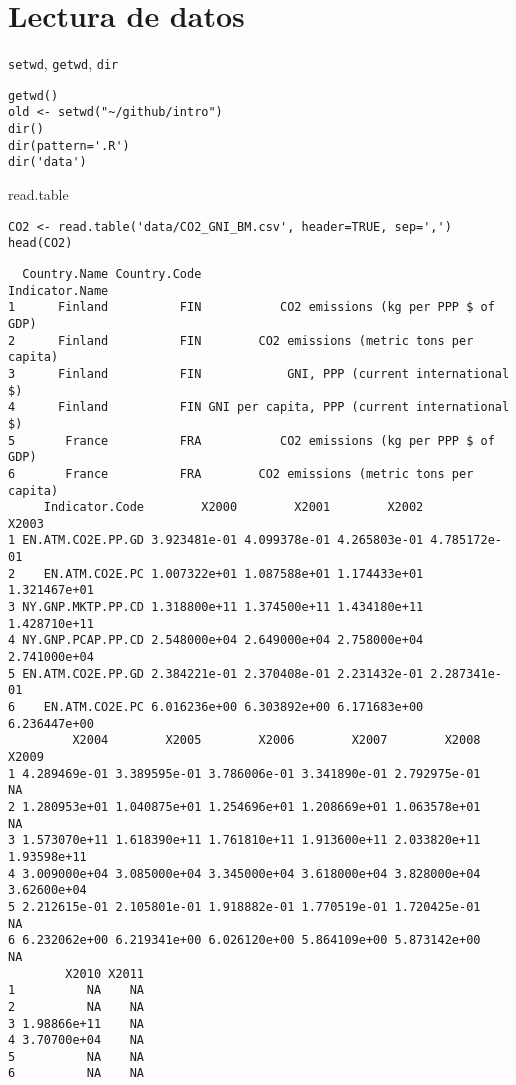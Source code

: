 \documentclass[xcolor={usenames,svgnames,dvipsnames}]{beamer}
\begin{document}
\section{Lectura de datos}
\label{sec-2}
\begin{frame}[fragile,label=sec-2-1]{\texttt{setwd}, \texttt{getwd}, \texttt{dir}}
 \lstset{language=R,numbers=none}
\begin{lstlisting}
getwd()
old <- setwd("~/github/intro")
dir()
dir(pattern='.R')
dir('data')
\end{lstlisting}
\end{frame}
\begin{frame}[fragile,label=sec-2-2]{read.table}
 \lstset{language=R,numbers=none}
\begin{lstlisting}
CO2 <- read.table('data/CO2_GNI_BM.csv', header=TRUE, sep=',')
head(CO2)
\end{lstlisting}

\begin{verbatim}
  Country.Name Country.Code                                Indicator.Name
1      Finland          FIN           CO2 emissions (kg per PPP $ of GDP)
2      Finland          FIN        CO2 emissions (metric tons per capita)
3      Finland          FIN            GNI, PPP (current international $)
4      Finland          FIN GNI per capita, PPP (current international $)
5       France          FRA           CO2 emissions (kg per PPP $ of GDP)
6       France          FRA        CO2 emissions (metric tons per capita)
     Indicator.Code        X2000        X2001        X2002        X2003
1 EN.ATM.CO2E.PP.GD 3.923481e-01 4.099378e-01 4.265803e-01 4.785172e-01
2    EN.ATM.CO2E.PC 1.007322e+01 1.087588e+01 1.174433e+01 1.321467e+01
3 NY.GNP.MKTP.PP.CD 1.318800e+11 1.374500e+11 1.434180e+11 1.428710e+11
4 NY.GNP.PCAP.PP.CD 2.548000e+04 2.649000e+04 2.758000e+04 2.741000e+04
5 EN.ATM.CO2E.PP.GD 2.384221e-01 2.370408e-01 2.231432e-01 2.287341e-01
6    EN.ATM.CO2E.PC 6.016236e+00 6.303892e+00 6.171683e+00 6.236447e+00
         X2004        X2005        X2006        X2007        X2008       X2009
1 4.289469e-01 3.389595e-01 3.786006e-01 3.341890e-01 2.792975e-01          NA
2 1.280953e+01 1.040875e+01 1.254696e+01 1.208669e+01 1.063578e+01          NA
3 1.573070e+11 1.618390e+11 1.761810e+11 1.913600e+11 2.033820e+11 1.93598e+11
4 3.009000e+04 3.085000e+04 3.345000e+04 3.618000e+04 3.828000e+04 3.62600e+04
5 2.212615e-01 2.105801e-01 1.918882e-01 1.770519e-01 1.720425e-01          NA
6 6.232062e+00 6.219341e+00 6.026120e+00 5.864109e+00 5.873142e+00          NA
        X2010 X2011
1          NA    NA
2          NA    NA
3 1.98866e+11    NA
4 3.70700e+04    NA
5          NA    NA
6          NA    NA
\end{verbatim}
\end{frame}
\end{document}
